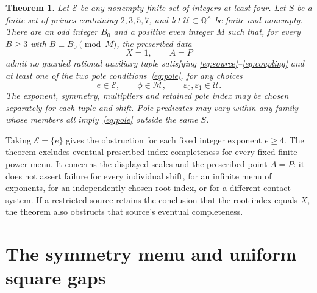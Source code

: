 \documentclass[11pt,a4paper]{article}
\newtheorem{theorem}{Theorem}[section]
\newcommand{\Q}{\mathbb Q}\newcommand{\Z}{\mathbb Z}
\begin{document}
\begin{theorem}\label{thm:main}
Let $\mathcal E$ be any nonempty finite set of integers at least
four. Let $S$ be a finite set of primes containing $2,3,5,7$, and let
$\mathcal U\subset\Q^\times$ be finite and nonempty.
There are an odd integer $B_0$ and a positive even integer $M$ such
that, for every $B\ge3$ with $B\equiv B_0\pmod M$, the prescribed data
\[
                             X=1,\qquad A=P
\]
admit no guarded rational auxiliary tuple satisfying
\eqref{eq:source}--\eqref{eq:coupling} and at least one of the two
pole conditions~\eqref{eq:pole}, for any choices
\[
                  e\in\mathcal E,\qquad \phi\in\mathcal M,
                  \qquad \varepsilon_0,\varepsilon_1\in\mathcal U.
\]
The exponent, symmetry, multipliers and retained pole index may be
chosen separately for each tuple and shift. Pole predicates may vary
within any family whose members all imply~\eqref{eq:pole} outside
the same $S$.
\end{theorem}

Taking $\mathcal E=\{e\}$ gives the obstruction for each fixed integer
exponent $e\ge4$. The theorem excludes eventual prescribed-index
completeness for every fixed finite power menu. It concerns the
displayed scales and the prescribed point $A=P$: it does not assert
failure for every individual shift, for an infinite menu of exponents,
for an independently chosen root index, or for a different contact
system. If a restricted source retains the conclusion that the root
index equals $X$, the theorem also obstructs that source's eventual
completeness.

\section{The symmetry menu and uniform square gaps}
\end{document}
